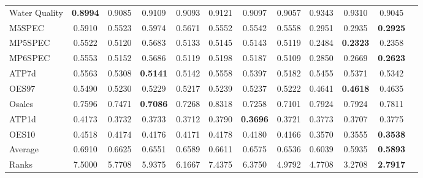 \documentclass[preprint,12pt]{elsarticle}
\begin{document}
{\begin{table*}[t!]
\begin{threeparttable}
{\begin{tabular}{lccccccccccc}
Water Quality &\textbf{0.8994} &0.9085 &0.9109 &0.9093 &0.9121 &0.9097 &0.9057 &0.9343 &0.9310 &0.9045 &  \\
M5SPEC &0.5910 &0.5523 &0.5974 &0.5671 &0.5552 &0.5542 &0.5558 &0.2951 &0.2935 &\textbf{0.2925} &  \\
MP5SPEC &0.5522 &0.5120 &0.5683 &0.5133 &0.5145 &0.5143 &0.5119 &0.2484 &\textbf{0.2323} &0.2358 &  \\
MP6SPEC &0.5553 &0.5152 &0.5686 &0.5119 &0.5198 &0.5187 &0.5109 &0.2850 &0.2669 &\textbf{0.2623} &  \\
ATP7d &0.5563 &0.5308 &\textbf{0.5141} &0.5142 &0.5558 &0.5397 &0.5182 &0.5455 &0.5371 &0.5342 &  \\
OES97 &0.5490 &0.5230 &0.5229 &0.5217 &0.5239 &0.5237 &0.5222 &0.4641 &\textbf{0.4618} &0.4635 &  \\
Osales &0.7596 &0.7471 &\textbf{0.7086} &0.7268 &0.8318 &0.7258 &0.7101 &0.7924 &0.7924 &0.7811 &  \\
ATP1d &0.4173 &0.3732 &0.3733 &0.3712 &0.3790 &\textbf{0.3696} &0.3721 &0.3773 &0.3707 &0.3775 &  \\
OES10 &0.4518 &0.4174 &0.4176 &0.4171 &0.4178 &0.4180 &0.4166 &0.3570 &0.3555 &\textbf{0.3538} &  \\
\hline
Average &0.6910 &0.6625 &0.6551 &0.6589 &0.6611 &0.6575 &0.6536 &0.6039 &0.5935 &\textbf{0.5893} &  \\
Ranks &7.5000 &5.7708 &5.9375 &6.1667 &7.4375 &6.3750 &4.9792 &4.7708 &3.2708 &\textbf{2.7917} &  \\
\bottomrule
\end{tabular}}
\end{threeparttable}
\label{tab:arrmseresults}
\end{table*}
\vspace{-2.7em}
\begin{figure}[h!]
\centering
\small
{}
\end{figure}}
\end{document}
